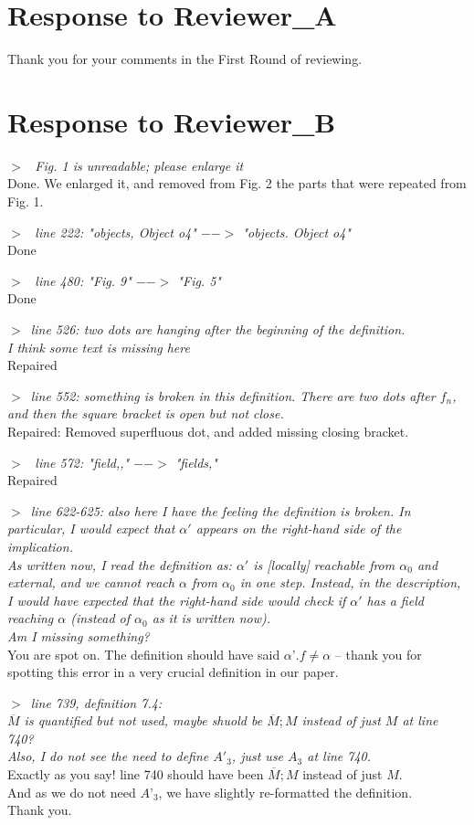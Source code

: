 \documentclass{article}
\newcommand{\pair}[2]{\noindent $>$\  \emph{#1}   \\ {#2}\\ \vspace{.1pt}}
\begin{document}
\section{Response to  Reviewer\_A}

Thank you for your comments in the First Round of reviewing.

\section{Response to Reviewer\_B }

\pair{ Fig. 1 is unreadable; please enlarge it}
{Done. We enlarged it, and removed from Fig. 2 the parts that were repeated from Fig. 1.}

\pair{  line 222: "objects, Object o4" $-->$ "objects. Object o4"}
{Done}

\pair{ line 480: "Fig. 9" $-->$ "Fig. 5"}
{Done}

\pair{line 526: two dots are hanging after the beginning of the definition. \\ I think some text is missing here}
{Repaired}

\pair{line 552: something is broken in this definition. There are two dots after $f_n$, and then the square bracket is open but not close.}
{Repaired: Removed superfluous dot, and added missing closing bracket.}

\pair{ line 572: "field,," $-->$  "fields,"}
{Repaired}

\pair{line 622-625: also here I have the feeling the definition is broken. In particular, I would expect that $\alpha'$ appears on the right-hand side of the implication. 
\\
As written now, I read the definition as: $\alpha'$ is [locally] reachable from $\alpha_0$ and external, and we cannot reach $\alpha$ from $\alpha_0$ in one step. Instead, in the description, I would have expected that the right-hand side would check if $\alpha'$ has a field reaching $\alpha$ (instead of $\alpha_0$ as it is written now). \\
Am I missing something?}
{You are spot on. The definition should have said $\alpha’.f\neq \alpha$ -- thank you for spotting this error in a very crucial definition in our paper.}

\pair{line 739, definition 7.4: \\ $\overline{M}$ is quantified but not used, maybe shuold be $\overline{M};M$ instead of just $M$ at line 740? \\
Also, I do not see the need to define $A'_3$, just use $A_3$ at line 740.}
{Exactly as you say! line 740 should have been $\overline{M};M$ instead of just $M$. \\
And as we do not need $A’_3$, we have slightly re-formatted the definition. \\
Thank you.}
\end{document}
